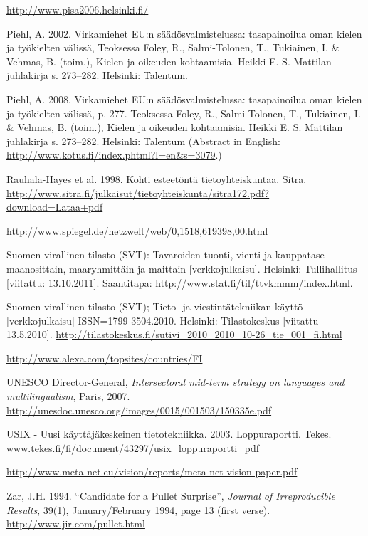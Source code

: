 \documentclass[]{../../metanetpaper}
\begin{document}
\begin{thebibliography}{102}
\url{http://www.pisa2006.helsinki.fi/}

Piehl, A. 2002. Virkamiehet EU:n säädösvalmistelussa: tasapainoilua oman
kielen ja työkielten välissä, Teoksessa Foley, R., Salmi-Tolonen, T.,
Tukiainen, I. \& Vehmas, B. (toim.), Kielen ja oikeuden kohtaamisia. Heikki E.
S. Mattilan juhlakirja s. 273–282. Helsinki: Talentum.

Piehl, A. 2008, Virkamiehet EU:n säädösvalmistelussa: tasapainoilua oman
kielen ja työkielten välissä, p. 277. Teoksessa Foley, R., Salmi-Tolonen, T.,
Tukiainen, I. \& Vehmas, B. (toim.), Kielen ja oikeuden kohtaamisia. Heikki E.
S. Mattilan juhlakirja s. 273–282. Helsinki: Talentum (Abstract in English:
\url{http://www.kotus.fi/index.phtml?l=en&s=3079}.)

Rauhala-Hayes et al. 1998. Kohti esteetöntä tietoyhteiskuntaa. Sitra.
\url{http://www.sitra.fi/julkaisut/tietoyhteiskunta/sitra172.pdf?download=Lataa+pdf}

\url{http://www.spiegel.de/netzwelt/web/0,1518,619398,00.html}

Suomen virallinen tilasto (SVT): Tavaroiden tuonti, vienti ja kauppatase
maanosittain, maaryhmittäin ja maittain [verkkojulkaisu]. Helsinki:
Tullihallitus [viitattu: 13.10.2011].
Saantitapa: \url{http://www.stat.fi/til/ttvkmmm/index.html}.

Suomen virallinen tilasto (SVT); Tieto- ja viestintätekniikan käyttö
[verkkojulkaisu] ISSN=1799-3504.2010. Helsinki: Tilastokeskus [viitattu
13.5.2010].
\url{http://tilastokeskus.fi/sutivi_2010_2010_10-26_tie_001_fi.html}

\url{http://www.alexa.com/topsites/countries/FI}

UNESCO Director-General,
\emph{Intersectoral mid-term strategy on languages and multilingualism},
Paris, 2007.
\url{http://unesdoc.unesco.org/images/0015/001503/150335e.pdf}

USIX - Uusi käyttäjäkeskeinen tietotekniikka. 2003. Loppuraportti. Tekes.
\url{www.tekes.fi/fi/document/43297/usix_loppuraportti_pdf}

\url{http://www.meta-net.eu/vision/reports/meta-net-vision-paper.pdf}

Zar, J.H. 1994. “Candidate for a Pullet Surprise”,
\emph{Journal of Irreproducible Results}, 39(1),
January/February 1994, page 13 (first verse).
\url{http://www.jir.com/pullet.html}

\end{thebibliography}
\end{document}
